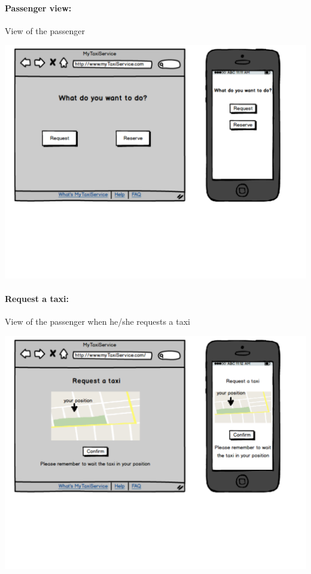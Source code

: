 \paragraph{Passenger view:}
View of the passenger
\begin{center}
	\includegraphics[width=\textwidth]{mockup/passengerFunctions.pdf}
\end{center}

\paragraph{Request a taxi:}
View of the passenger when he/she requests a taxi
\begin{center}
	\includegraphics[width=\textwidth]{mockup/request.pdf}
\end{center}

